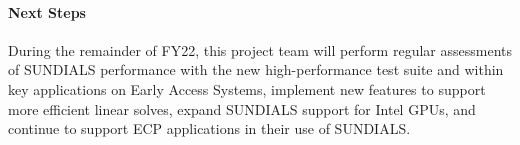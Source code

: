 \paragraph{Next Steps}

During the remainder of FY22, this project team will perform regular assessments of SUNDIALS performance 
with the new high-performance test suite and within key applications on Early Access Systems, implement 
new features to support more efficient linear solves, expand SUNDIALS support for Intel GPUs, and continue 
to support ECP applications in their use of SUNDIALS.

